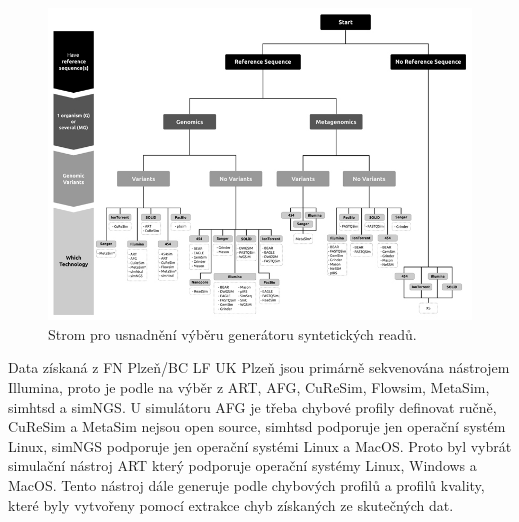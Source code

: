 \documentclass[czech,DP]{thesiskiv}
\numberwithin{equation}{section}
\begin{document}
\begin{figure}[H]		
		\centering
		\includegraphics[width=1\textwidth]{./img/read_simulators.jpg}
		\caption{Strom pro usnadnění výběru generátoru syntetických readů. \cite{simulation_read}}
		\label{fig:read_simulators}
\end{figure}

\noindent
Data získaná z FN Plzeň/BC LF UK Plzeň jsou primárně sekvenována nástrojem Illumina, proto je podle \cite{simulation_read} na výběr z ART, AFG, CuReSim, Flowsim, MetaSim, simhtsd a simNGS. U simulátoru AFG je třeba chybové profily definovat ručně, CuReSim a MetaSim nejsou open source, simhtsd podporuje jen operační systém Linux, simNGS podporuje jen operační systémi Linux a MacOS. Proto byl vybrát simulační nástroj ART který podporuje operační systémy Linux, Windows a MacOS. Tento nástroj dále generuje podle chybových profilů a profilů kvality, které byly vytvořeny pomocí extrakce chyb získaných ze skutečných dat. 
\end{document}

